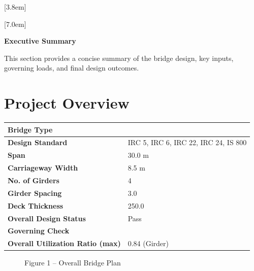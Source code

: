 \documentclass[12pt,a4paper]{report}
\numberwithin{table}{chapter}
\numberwithin{figure}{chapter}
\begin{document}
[3.8em]
  {\normalfont}
  {\contentslabel{2.3em}}
  {\hspace*{-2.3em}}
  {\hfill\contentspage}

[7.0em]
  {\normalfont}
  {\contentslabel{3.2em}}
  {\hspace*{-3.2em}}
  {\hfill\contentspage}

\newpage
\renewcommand{\contentsname}{\centering\Large\bfseries Table of Contents}
\tableofcontents


\newpage
{\centering\Large\bfseries Executive Summary\par}
\vspace{0.8em}

This section provides a concise summary of the bridge design, key inputs, governing loads, and final design outcomes.

\section*{Project Overview}
\label{sec:project-overview}


\begin{tabular}{|L{5.5cm}|L{8.5cm}|}
\hline
\textbf{Bridge Type} &  \\
\hline
\textbf{Design Standard} & IRC 5, IRC 6, IRC 22, IRC 24, IS 800 \\
\hline
\textbf{Span} & 30.0 m \\
\hline
\textbf{Carriageway Width} & 8.5 m \\
\hline
\textbf{No. of Girders} & 4 \\
\hline
\textbf{Girder Spacing} & 3.0 \\
\hline
\textbf{Deck Thickness} & 250.0 \\
\hline
\textbf{Overall Design Status} & Pass \\
\hline
\textbf{Governing Check} &  \\
\hline
\textbf{Overall Utilization Ratio (max)} & 0.84 (Girder) \\
\hline
\end{tabular}


\begin{figure}[H]
\centering
{}
\caption*{Figure 1 -- Overall Bridge Plan}
\end{figure}

\newpage
\end{document}
